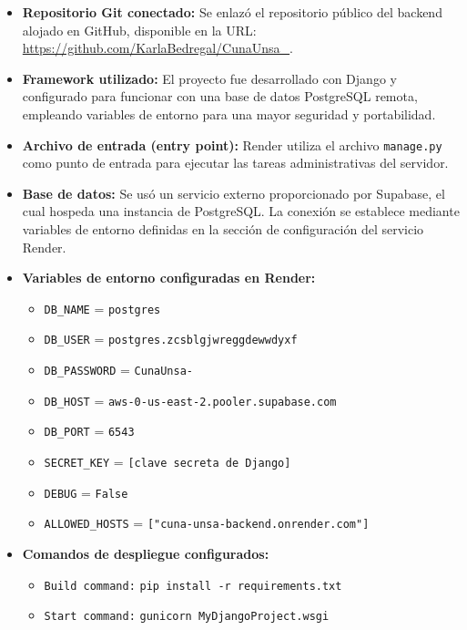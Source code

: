 \documentclass{article}
\begin{document}
        \begin{itemize}
            \item \textbf{Repositorio Git conectado:} Se enlazó el repositorio público del backend alojado en GitHub, disponible en la URL: \url{https://github.com/KarlaBedregal/CunaUnsa\_}.

            \item \textbf{Framework utilizado:} El proyecto fue desarrollado con Django y configurado para funcionar con una base de datos PostgreSQL remota, empleando variables de entorno para una mayor seguridad y portabilidad.

            \item \textbf{Archivo de entrada (entry point):} Render utiliza el archivo \texttt{manage.py} como punto de entrada para ejecutar las tareas administrativas del servidor.

            \item \textbf{Base de datos:} Se usó un servicio externo proporcionado por Supabase, el cual hospeda una instancia de PostgreSQL. La conexión se establece mediante variables de entorno definidas en la sección de configuración del servicio Render.

            \item \textbf{Variables de entorno configuradas en Render:}
            \begin{itemize}
                \item \texttt{DB\_NAME} = \texttt{postgres}
                \item \texttt{DB\_USER} = \texttt{postgres.zcsblgjwreggdewwdyxf}
                \item \texttt{DB\_PASSWORD} = \texttt{CunaUnsa-}
                \item \texttt{DB\_HOST} = \texttt{aws-0-us-east-2.pooler.supabase.com}
                \item \texttt{DB\_PORT} = \texttt{6543}
                \item \texttt{SECRET\_KEY} = \texttt{[clave secreta de Django]}
                \item \texttt{DEBUG} = \texttt{False}
                \item \texttt{ALLOWED\_HOSTS} = \texttt{["cuna-unsa-backend.onrender.com"]}
            \end{itemize}

            \item \textbf{Comandos de despliegue configurados:}
            \begin{itemize}
                \item \texttt{Build command:} \texttt{pip install -r requirements.txt}
                \item \texttt{Start command:} \texttt{gunicorn MyDjangoProject.wsgi}
            \end{itemize}


\end{itemize}
\end{document}

